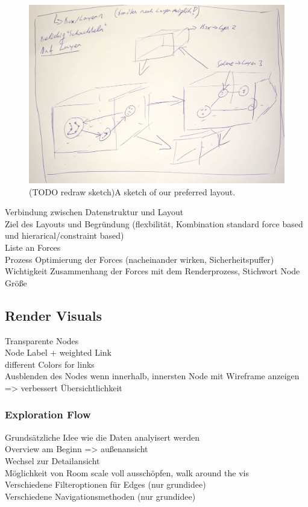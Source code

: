 \begin{figure}[h]
    \centering
    \includegraphics[width=1\textwidth]{chapters/graphics/concept1.jpg}
    \caption{(TODO redraw sketch)A sketch of our preferred layout. } 
    \label{fig:layoutSketch} 
\end{figure}

Verbindung zwischen Datenstruktur und Layout\\
Ziel des Layouts und Begründung (flexbilität, Kombination standard force based und hierarical/constraint based)\\
Liste an Forces\\
Prozess Optimierung der Forces (nacheinander wirken, Sicherheitspuffer)\\
Wichtigkeit Zusammenhang der Forces mit dem Renderprozess, Stichwort Node Größe

\subsection{Render Visuals}

Transparente Nodes\\
Node Label + weighted Link\\
different Colors for links\\
Ausblenden des Nodes wenn innerhalb, innersten Node mit Wireframe anzeigen => verbessert Übersichtlichkeit\\

\subsubsection{Exploration Flow}

Grundsätzliche Idee wie die Daten analyisert werden\\
Overview am Beginn => außenansicht \\
Wechsel zur Detailansicht\\
Möglichkeit von Room scale voll ausschöpfen, walk around the vis\\
Verschiedene Filteroptionen für Edges (nur grundidee)\\
Verschiedene Navigationsmethoden (nur grundidee)\\

